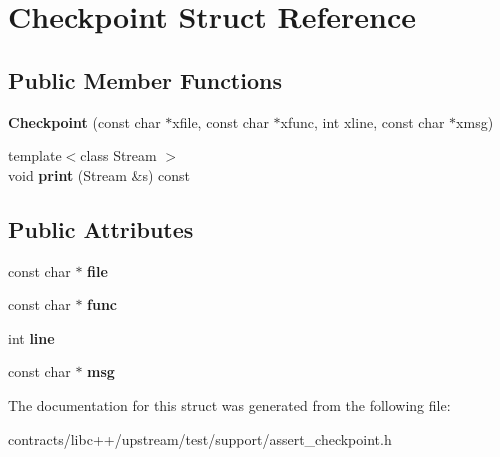 \hypertarget{struct_checkpoint}{}\section{Checkpoint Struct Reference}
\label{struct_checkpoint}
\subsection*{Public Member Functions}
\begin{DoxyCompactItemize}
\item 
\mbox{\label{struct_checkpoint_a2e17c1c8f67f72cd047237f35327aa4e}} 
{\bfseries Checkpoint} (const char $\ast$xfile, const char $\ast$xfunc, int xline, const char $\ast$xmsg)
\item 
\mbox{\label{struct_checkpoint_a57ba938da450f857fba9947ceeee1969}} 
{\footnotesize template$<$class Stream $>$ }\\void {\bfseries print} (Stream \&s) const
\end{DoxyCompactItemize}
\subsection*{Public Attributes}
\begin{DoxyCompactItemize}
\item 
\mbox{\label{struct_checkpoint_a075045e2bb0c12fce3fa9b43ae717e4d}} 
const char $\ast$ {\bfseries file}
\item 
\mbox{\label{struct_checkpoint_aa654ef84a68ea6acdeaff4f37f100bc6}} 
const char $\ast$ {\bfseries func}
\item 
\mbox{\label{struct_checkpoint_ac3b4cc440d92489957361f684c5a07d5}} 
int {\bfseries line}
\item 
\mbox{\label{struct_checkpoint_a1b407982d5de5e5ef628d546668ce732}} 
const char $\ast$ {\bfseries msg}
\end{DoxyCompactItemize}


The documentation for this struct was generated from the following file\+:\begin{DoxyCompactItemize}
\item 
contracts/libc++/upstream/test/support/assert\+\_\+checkpoint.\+h\end{DoxyCompactItemize}
